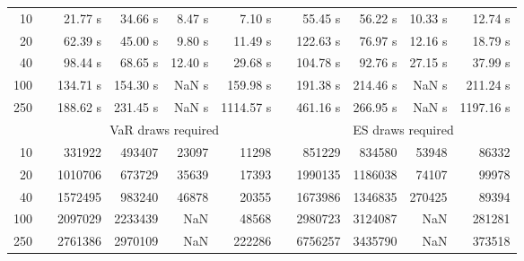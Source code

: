 {{\begin{longtable}{rr rrrr r rrrr}
10 & & 21.77 s & 34.66 s & 8.47 s & 7.10 s && 55.45 s & 56.22 s & 10.33 s & 12.74 s \\ 
20 & & 62.39 s & 45.00 s & 9.80 s & 11.49 s && 122.63 s & 76.97 s & 12.16 s & 18.79 s \\ 
40 & & 98.44 s & 68.65 s & 12.40 s & 29.68 s && 104.78 s & 92.76 s & 27.15 s & 37.99 s \\ 
100 & & 134.71 s & 154.30 s &  NaN s & 159.98 s && 191.38 s & 214.46 s &  NaN s & 211.24 s \\ 
250 & & 188.62 s & 231.45 s &  NaN s & 1114.57 s && 461.16 s & 266.95 s &  NaN s & 1197.16 s \\ 
\hline 
 && \multicolumn{4}{c}{VaR draws required} &&   \multicolumn{4}{c}{ES draws required} \\  \cline{3-6}  \cline{8-11} 
10 & & 331922 & 493407 & 23097 & 11298 && 851229 & 834580 & 53948  & 86332 \\ 
20 & & 1010706 & 673729 & 35639 & 17393 && 1990135 & 1186038 & 74107  & 99978 \\ 
40 & & 1572495 & 983240 & 46878 & 20355 && 1673986 & 1346835 & 270425  & 89394 \\ 
100 & & 2097029 & 2233439 & NaN & 48568 && 2980723 & 3124087 & NaN  & 281281 \\ 
250 & & 2761386 & 2970109 & NaN & 222286 && 6756257 & 3435790 & NaN  & 373518 \\ 
\hline 
\end{longtable} 
} 
} 
